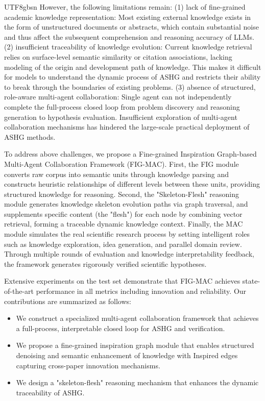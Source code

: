 \documentclass[11pt]{article}
\begin{document}
\begin{CJK}{UTF8}{gbsn}
However, the following limitations remain: (1) lack of fine-grained academic knowledge representation: Most existing external knowledge exists in the form of unstructured documents or abstracts, which contain substantial noise and thus affect the subsequent comprehension and reasoning accuracy of LLMs. (2) insufficient traceability of knowledge evolution: Current knowledge retrieval relies on surface-level semantic similarity or citation associations, lacking modeling of the origin and development path of knowledge. This makes it difficult for models to understand the dynamic process of ASHG and restricts their ability to break through the boundaries of existing problems. (3) absence of structured, role-aware multi-agent collaboration: Single agent can not independently complete the full-process closed loop from problem discovery and reasoning generation to hypothesis evaluation. Insufficient exploration of multi-agent collaboration mechanisms has hindered the large-scale practical deployment of ASHG methods.

To address above challenges, we propose a Fine-grained Inspiration Graph-based Multi-Agent Collaboration Framework (FIG-MAC). First, the FIG module converts raw corpus into semantic units through knowledge parsing and constructs heuristic relationships of different levels between these units, providing structured knowledge for reasoning. Second, the "Skeleton-Flesh" reasoning module generates knowledge skeleton evolution paths via graph traversal, and supplements specific content (the "flesh") for each node by combining vector retrieval, forming a traceable dynamic knowledge context. Finally, the MAC module simulates the real scientific research process by setting intelligent roles such as knowledge exploration, idea generation, and parallel domain review. Through multiple rounds of evaluation and knowledge interpretability feedback, the framework generates rigorously verified scientific hypotheses. 

Extensive experiments on the test set demonstrate that FIG-MAC achieves state-of-the-art performance in all metrics including innovation and reliability. Our contributions are summarized as follows:

\begin{itemize}[leftmargin=*]
\setlength{\itemsep}{-3pt}
\item We construct a specialized multi-agent collaboration framework that achieves a full-process, interpretable closed loop for ASHG and verification.
\item We propose a fine-grained inspiration graph module that enables structured denoising and semantic enhancement of knowledge with Inspired edges capturing cross-paper innovation mechanisms.
\item We design a "skeleton-flesh" reasoning mechanism that enhances the dynamic traceability of ASHG.
\end{itemize}



\end{CJK}
\end{document}
